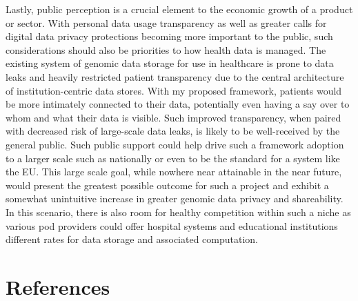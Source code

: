 \documentclass[a4paper,11pt]{article}
\begin{document}
\begin{refsection}
Lastly, public perception is a crucial element to the economic growth of a product or sector. 
With personal data usage transparency as well as greater calls for digital data privacy protections becoming more important to the public, such considerations should also be priorities to how health data is managed. 
The existing system of genomic data storage for use in healthcare is prone to data leaks and heavily restricted patient transparency due to the central architecture of institution-centric data stores. 
With my proposed framework, patients would be more intimately connected to their data, potentially even having a say over to whom and what their data is visible. 
Such improved transparency, when paired with decreased risk of large-scale data leaks, is likely to be well-received by the general public. 
Such public support could help drive such a framework adoption to a larger scale such as nationally or even to be the standard for a system like the EU. 
This large scale goal, while nowhere near attainable in the near future, would present the greatest possible outcome for such a project and exhibit a somewhat unintuitive increase in greater genomic data privacy and shareability. 
In this scenario, there is also room for healthy competition within such a niche as various pod providers could offer hospital systems and educational institutions different rates for data storage and associated computation.


\section{References}
\smallskip
\printbibliography[heading=none]


\end{refsection}
\end{document}
